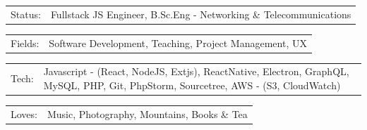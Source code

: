 \documentclass[10pt,A4]{article}
\newcommand{\tzlarrow}{(0,0) -- (0.2,0) -- (0.3,0.2) -- (0.2,0.4) -- (0,0.4) -- (0.1,0.2) -- cycle;}
\newcommand{\larrow}[1]
{\begin{tikzpicture}[scale=0.58]
	 \filldraw[fill=#1!100,draw=#1!100!black]  \tzlarrow
 \end{tikzpicture}
}
\newcommand{\cvsection}[1]
{
\colorbox{sectcol}{\mystrut \makebox[1\linewidth][l]{
\larrow{bgcol} \hspace{-8pt} \larrow{bgcol} \hspace{-8pt} \larrow{bgcol} \textcolor{white}{\textbf{#1}}\hspace{4pt}
}}\\
}
\newcommand{\metasection}[2]
{
\begin{tabular*}{1\textwidth}{p{2.4cm} p{11cm}}
\larrow{bgcol}	\normalsize{\textcolor{sectcol}{#1}}&#2\\[12pt]
\end{tabular*}
}
\newcommand{\mystrut}{\rule[-.3\baselineskip]{0pt}{\baselineskip}}
\begin{document}

\vspace{-114pt}

\metasection{Status:}{Fullstack JS Engineer, B.Sc.Eng - Networking \& Telecommunications}
\metasection{Fields:}{Software Development, Teaching, Project Management, UX}
\metasection{Tech:}{Javascript - (React, NodeJS, Extjs), ReactNative, Electron, GraphQL, MySQL, PHP, Git, PhpStorm, Sourcetree, AWS - (S3, CloudWatch)}
\metasection{Loves:}{Music, Photography, Mountains, Books \& Tea}

\vspace{6pt}




%
%
\end{document}
